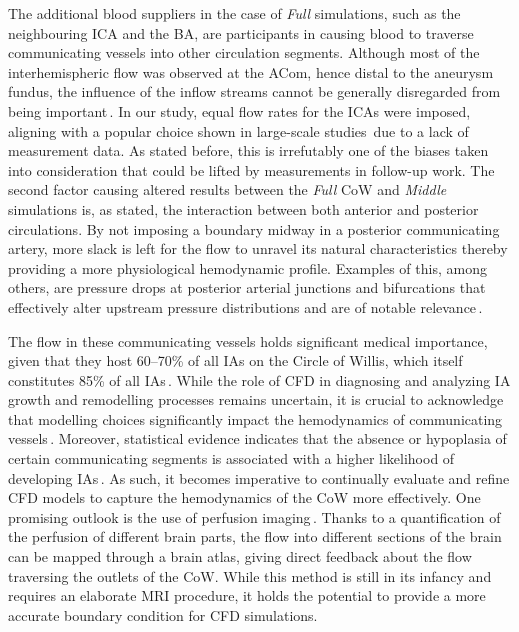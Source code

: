 The additional blood suppliers in the case of \textit{Full} simulations, such as the neighbouring ICA and the BA, are participants in causing blood to traverse communicating vessels into other circulation segments. Although most of the interhemispheric flow was observed at the ACom, hence distal to the aneurysm fundus, the influence of the inflow streams cannot be generally disregarded from being important\,\cite{Castro2006}. In our study, equal flow rates for the ICAs were imposed, aligning with a popular choice shown in large-scale studies\,\cite{Valen-Sendstad2018} due to a lack of measurement data. As stated before, this is irrefutably one of the biases taken into consideration that could be lifted by measurements in follow-up work. The second factor causing altered results between the \textit{Full} CoW and \textit{Middle} simulations is, as stated, the interaction between both anterior and posterior circulations. By not imposing a boundary midway in a posterior communicating artery, more slack is left for the flow to unravel its natural characteristics thereby providing a more physiological hemodynamic profile. Examples of this, among others, are pressure drops at posterior arterial junctions and bifurcations that effectively alter upstream pressure distributions and are of notable relevance\,\cite{Mynard2015, Chnafa2017}.

The flow in these communicating vessels holds significant medical importance, given that they host 60--70\% of all IAs on the Circle of Willis, which itself constitutes 85\% of all IAs\,\cite{Hacein-Bey2011}. While the role of CFD in diagnosing and analyzing IA growth and remodelling processes remains uncertain, it is crucial to acknowledge that modelling choices significantly impact the hemodynamics of communicating vessels\,\cite{Zhang2016}. Moreover, statistical evidence indicates that the absence or hypoplasia of certain communicating segments is associated with a higher likelihood of developing IAs\,\cite{Hindenes2023, Feng2023}. As such, it becomes imperative to continually evaluate and refine CFD models to capture the hemodynamics of the CoW more effectively. One promising outlook is the use of perfusion imaging\,\cite{Zhang2016, Schollenberger2021}. Thanks to a quantification of the perfusion of different brain parts, the flow into different sections of the brain can be mapped through a brain atlas, giving direct feedback about the flow traversing the outlets of the CoW. While this method is still in its infancy and requires an elaborate MRI procedure, it holds the potential to provide a more accurate boundary condition for CFD simulations.\\
\vspace*{1cm}

